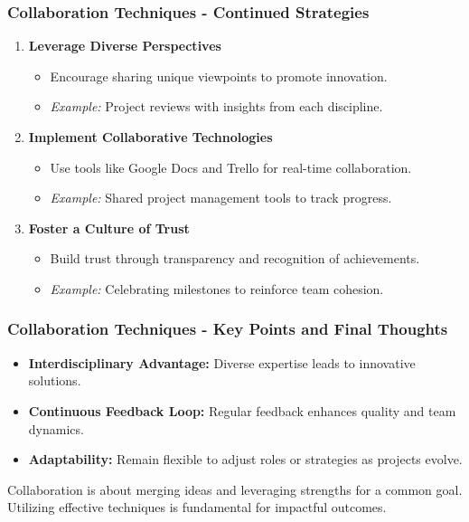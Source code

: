 \documentclass{beamer}
\begin{document}
\begin{frame}[fragile]
    \frametitle{Collaboration Techniques - Continued Strategies}
    \begin{enumerate}[resume]
        \item \textbf{Leverage Diverse Perspectives}
        \begin{itemize}
            \item Encourage sharing unique viewpoints to promote innovation.
            \item \textit{Example:} Project reviews with insights from each discipline.
        \end{itemize}

        \item \textbf{Implement Collaborative Technologies}
        \begin{itemize}
            \item Use tools like Google Docs and Trello for real-time collaboration.
            \item \textit{Example:} Shared project management tools to track progress.
        \end{itemize}

        \item \textbf{Foster a Culture of Trust}
        \begin{itemize}
            \item Build trust through transparency and recognition of achievements.
            \item \textit{Example:} Celebrating milestones to reinforce team cohesion.
        \end{itemize}
    \end{enumerate}
\end{frame}

\begin{frame}[fragile]
    \frametitle{Collaboration Techniques - Key Points and Final Thoughts}
    \begin{itemize}
        \item \textbf{Interdisciplinary Advantage:} Diverse expertise leads to innovative solutions.
        \item \textbf{Continuous Feedback Loop:} Regular feedback enhances quality and team dynamics.
        \item \textbf{Adaptability:} Remain flexible to adjust roles or strategies as projects evolve.
    \end{itemize}

    Collaboration is about merging ideas and leveraging strengths for a common goal. Utilizing effective techniques is fundamental for impactful outcomes.
\end{frame}
\end{document}

